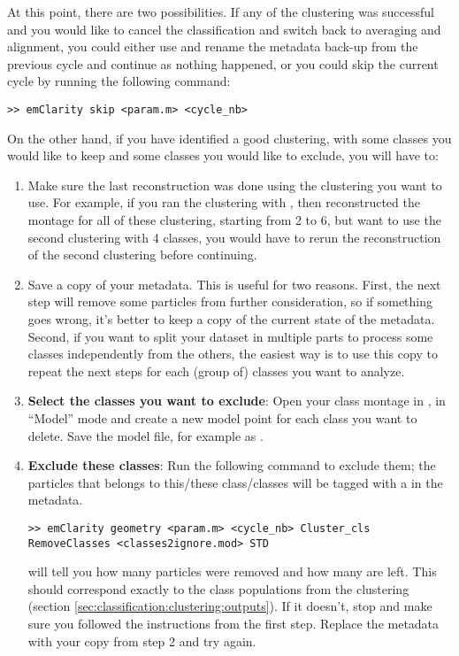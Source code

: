 At this point, there are two possibilities. If any of the clustering was successful and you would like to cancel the classification and switch back to averaging and alignment, you could either use and rename the metadata back-up from the previous cycle and continue as nothing happened, or you could skip the current cycle by running the following command:
\begin{lstlisting}
>> emClarity skip <param.m> <cycle_nb>
\end{lstlisting}

On the other hand, if you have identified a good clustering, with some classes you would like to keep and some classes you would like to exclude, you will have to:
\begin{enumerate}
    \item Make sure the last reconstruction was done using the clustering you want to use. For example, if you ran the clustering with , then reconstructed the montage for all of these clustering, starting from 2 to 6, but want to use the second clustering with 4 classes, you would have to rerun the reconstruction of the second clustering before continuing.
    
    \item Save a copy of your metadata. This is useful for two reasons. First, the next step will remove some particles from further consideration, so if something goes wrong, it's better to keep a copy of the current state of the metadata. Second, if you want to split your dataset in multiple parts to process some classes independently from the others, the easiest way is to use this copy to repeat the next steps for each (group of) classes you want to analyze.

    \item \textbf{Select the classes you want to exclude}: Open your class montage in , in ``Model'' mode and create a new model point for each class you want to delete. Save the model file, for example as .
    
    \item \textbf{Exclude these classes}: Run the following command to exclude them; the particles that belongs to this/these class/classes will be tagged with a  in the metadata.
\begin{lstlisting}
>> emClarity geometry <param.m> <cycle_nb> Cluster_cls RemoveClasses <classes2ignore.mod> STD
\end{lstlisting}
    {\emClarity} will tell you how many particles were removed and how many are left. This should correspond exactly to the class populations from the clustering (section \ref{sec:classification:clustering:outputs}). If it doesn't, stop and make sure you followed the instructions from the first step. Replace the metadata with your copy from step 2 and try again.


\end{enumerate}
